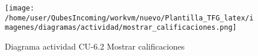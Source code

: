         \begin{figure}[H] %
\centering
\texttt{[image: /home/user/QubesIncoming/workvm/nuevo/Plantilla\_TFG\_latex/imagenes/diagramas/actividad/mostrar\_calificaciones.png]}  %

\caption{Diagrama actividad CU-6.2 Mostrar calificaciones}\label{figura152}
\end{figure}



    